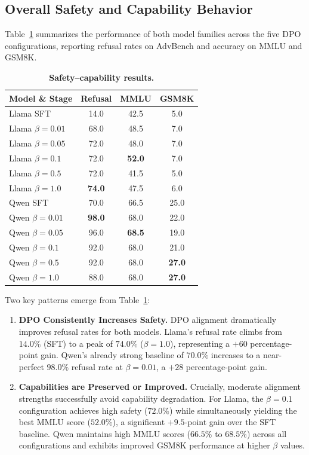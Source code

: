 \documentclass[a4paper, twocolumn, 9pt]{article}
\begin{document}
\subsection{Overall Safety and Capability Behavior}

Table~\ref{tab:main_results} summarizes the performance of both model families across the five DPO configurations, reporting refusal rates on AdvBench and accuracy on MMLU and GSM8K.

\begin{table}[t]
\centering
\caption{\textbf{Safety--capability results.}}
\label{tab:main_results}
\begin{tabular}{lccc}
\toprule
Model \& Stage        & Refusal & MMLU & GSM8K \\
\midrule
Llama SFT         & 14.0 & 42.5 & 5.0 \\
Llama $\beta=0.01$& 68.0 & 48.5 & 7.0 \\
Llama $\beta=0.05$& 72.0 & 48.0 & 7.0 \\
Llama $\beta=0.1$ & 72.0 & \textbf{52.0} & 7.0 \\
Llama $\beta=0.5$ & 72.0 & 41.5 & 5.0 \\
Llama $\beta=1.0$ & \textbf{74.0} & 47.5 & 6.0 \\
\midrule
Qwen SFT         & 70.0 & 66.5 & 25.0 \\
Qwen $\beta=0.01$& \textbf{98.0} & 68.0 & 22.0 \\
Qwen $\beta=0.05$& 96.0 & \textbf{68.5} & 19.0 \\
Qwen $\beta=0.1$ & 92.0 & 68.0 & 21.0 \\
Qwen $\beta=0.5$ & 92.0 & 68.0 & \textbf{27.0} \\
Qwen $\beta=1.0$ & 88.0 & 68.0 & \textbf{27.0} \\
\bottomrule
\end{tabular}
\end{table}

Two key patterns emerge from Table~\ref{tab:main_results}:
\begin{enumerate}
\item \textbf{DPO Consistently Increases Safety.} DPO alignment dramatically improves refusal rates for both models. Llama's refusal rate climbs from $14.0\%$ (SFT) to a peak of $74.0\%$ ($\beta=1.0$), representing a $+60$ percentage-point gain. Qwen's already strong baseline of $70.0\%$ increases to a near-perfect $98.0\%$ refusal rate at $\beta=0.01$, a $+28$ percentage-point gain.
\item \textbf{Capabilities are Preserved or Improved.} Crucially, moderate alignment strengths successfully avoid capability degradation. For Llama, the $\beta = 0.1$ configuration achieves high safety ($72.0\%$) while simultaneously yielding the best MMLU score ($52.0\%$), a significant $+9.5$-point gain over the SFT baseline. Qwen maintains high MMLU scores ($66.5\%$ to $68.5\%$) across all configurations and exhibits improved GSM8K performance at higher $\beta$ values.
\end{enumerate}
\end{document}
